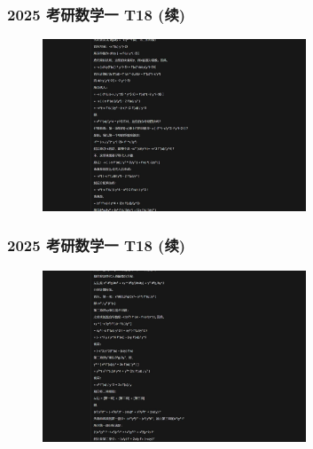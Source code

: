 \begin{frame}
    \frametitle{2025 考研数学一 T18 (续)}
    \begin{figure}
        \centering
        \includegraphics[width=0.7\textwidth]{./pic/9.png} %
        \label{fig:kaoyan_solution_1}
    \end{figure}
\end{frame}

\begin{frame}
    \frametitle{2025 考研数学一 T18 (续)}
    \begin{figure}
        \centering
        \includegraphics[width=0.7\textwidth]{./pic/10.png} %
        \label{fig:kaoyan_solution_2}
    \end{figure}
\end{frame}

